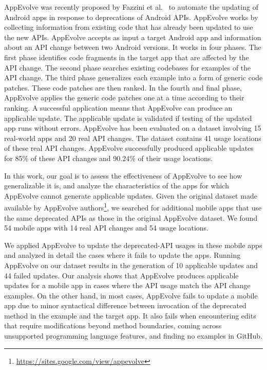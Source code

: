 AppEvolve was recently proposed by Fazzini et al.~\cite{fazzini2019automated} to
automate the updating of Android apps in response to deprecations of
Android APIs.  AppEvolve works by collecting information from existing code
that has already been updated to use the new APIs. 
AppEvolve accepts as input a target Android app and information about an API change between two Android versions. It works in four phases. The first phase identifies code fragments in the target app that are affected by the API change. The second phase searches existing codebases for examples of the API change. The third phase generalizes each example into a form of generic code patches. These code patches are then ranked. In the fourth and final phase, AppEvolve applies the generic code patches one at a time according to their ranking. A successful application means that AppEvolve can produce an applicable update. The applicable update is validated if testing of the updated app runs without errors. AppEvolve has been evaluated on a dataset involving 15 real-world apps and 20 real API changes. The dataset contains 41 usage locations of these real API changes. AppEvolve successfully produced applicable updates for 85\% of these API changes and 90.24\% of their usage locations. 

In this work, our goal is to assess the effectiveness of AppEvolve to see how generalizable it is, and
analyze the characteristics of the apps for which AppEvolve cannot generate applicable updates.
Given the original dataset made available by AppEvolve authors\footnote{\url{https://sites.google.com/view/appevolve}}, we searched for additional mobile apps that use the same deprecated APIs as those in the original AppEvolve dataset. We found 54 mobile apps with 14 real API changes and 54 usage locations. 

We applied AppEvolve to update the deprecated-API usages in these mobile apps and analyzed in detail the cases where it fails to update the apps. Running AppEvolve on our dataset results in the generation of 10 applicable updates and 44 failed updates. Our analysis shows that AppEvolve produces applicable updates for a mobile app in cases where the API usage match the API change examples.  On the other hand, in most cases, AppEvolve fails to update a mobile app due to minor syntactical difference between invocation of the deprecated method in the example and the target app. It also fails when encountering edits that require modifications beyond method boundaries, coming across unsupported programming language features, and finding no examples  in GitHub.

